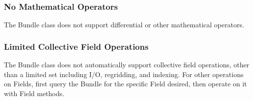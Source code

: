 

\subsubsection{No Mathematical Operators}
The Bundle class does not support differential or other
mathematical operators.

\subsubsection{Limited Collective Field Operations}
The Bundle class does not automatically support collective field 
operations, other than a limited set including I/O, regridding, and 
indexing.  For other operations on Fields, first query the Bundle 
for the specific Field desired, then operate on it with Field methods.





